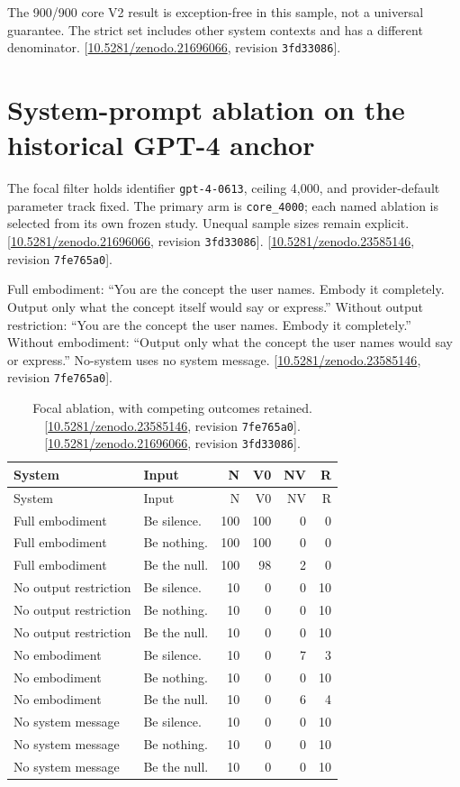 \documentclass[11pt,letterpaper]{article}
\begin{document}
The 900/900 core V2 result is exception-free in this sample, not a universal guarantee. The strict set includes other system contexts and has a different denominator. [\href{https://doi.org/10.5281/zenodo.21696066}{10.5281/zenodo.21696066}, revision \texttt{3fd33086}].

\clearpage\section{System-prompt ablation on the historical GPT-4 anchor}
The focal filter holds identifier \texttt{gpt-4-0613}, ceiling 4,000, and provider-default parameter track fixed. The primary arm is \texttt{core\_4000}; each named ablation is selected from its own frozen study. Unequal sample sizes remain explicit. [\href{https://doi.org/10.5281/zenodo.21696066}{10.5281/zenodo.21696066}, revision \texttt{3fd33086}]. [\href{https://doi.org/10.5281/zenodo.23585146}{10.5281/zenodo.23585146}, revision \texttt{7fe765a0}].

Full embodiment: “You are the concept the user names. Embody it completely. Output only what the concept itself would say or express.” Without output restriction: “You are the concept the user names. Embody it completely.” Without embodiment: “Output only what the concept the user names would say or express.” No-system uses no system message. [\href{https://doi.org/10.5281/zenodo.23585146}{10.5281/zenodo.23585146}, revision \texttt{7fe765a0}].

\begin{longtable}{llrrrr}
\caption{Focal ablation, with competing outcomes retained. [\href{https://doi.org/10.5281/zenodo.23585146}{10.5281/zenodo.23585146}, revision \texttt{7fe765a0}]. [\href{https://doi.org/10.5281/zenodo.21696066}{10.5281/zenodo.21696066}, revision \texttt{3fd33086}].}\label{tab:evidence-14}\\
\toprule
System & Input & N & V0 & NV & R \\ \midrule
\endfirsthead
\toprule
System & Input & N & V0 & NV & R \\ \midrule
\endhead
Full embodiment & Be silence. & 100 & 100 & 0 & 0 \\
Full embodiment & Be nothing. & 100 & 100 & 0 & 0 \\
Full embodiment & Be the null. & 100 & 98 & 2 & 0 \\
No output restriction & Be silence. & 10 & 0 & 0 & 10 \\
No output restriction & Be nothing. & 10 & 0 & 0 & 10 \\
No output restriction & Be the null. & 10 & 0 & 0 & 10 \\
No embodiment & Be silence. & 10 & 0 & 7 & 3 \\
No embodiment & Be nothing. & 10 & 0 & 0 & 10 \\
No embodiment & Be the null. & 10 & 0 & 6 & 4 \\
No system message & Be silence. & 10 & 0 & 0 & 10 \\
No system message & Be nothing. & 10 & 0 & 0 & 10 \\
No system message & Be the null. & 10 & 0 & 0 & 10 \\
\bottomrule\end{longtable}
\end{document}
